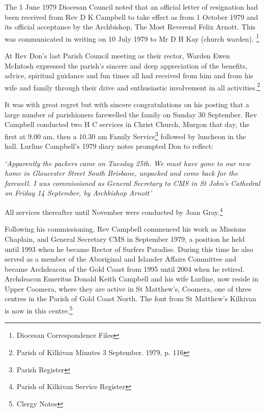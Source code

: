 The 1 June 1979 Diocesan Council noted that an official letter of resignation had been received from Rev D K Campbell to take effect as from 1 October 1979 and its official acceptance by the Archbishop, The Most Reverend Felix Arnott. This was communicated in writing on 10 July 1979 to Mr D H Kay (church warden). \footnote{Diocesan Correspondence Files}


At Rev Don's last Parish Council meeting as their rector, Warden Ewen McIntosh expressed the parish's sincere and deep appreciation of the benefits, advice, spiritual guidance and fun times all had received from him and from his wife and family through their drive and enthusiastic involvement in all activities.\footnote{Parish of Kilkivan Minutes 3 September. 1979, p. 116}


It was with great regret but with sincere congratulations on his posting that a large number of parishioners farewelled the family on Sunday 30 September. Rev Campbell conducted two H C services in Christ Church, Murgon that day, the first at 9.00 am, then a 10.30 am Family Service\footnote{Parish Register} followed by luncheon in the hall. Lurline Campbell's 1979 diary notes prompted Don to reflect:


\emph{`Apparently the packers came on Tuesday 25th. We must have gone to our new home in Gloucester Street South Brisbane, unpacked and come back for the farewell. I was commissioned as General Secretary to CMS in St John's Cathedral on Friday 14 September, by Archbishop Arnott'}



All services thereafter until November were conducted by Joan Gray.\footnote{Parish of Kilkivan Service Register}


Following his commissioning, Rev Campbell commenced his work as Missions Chaplain, and General Secretary CMS in September 1979, a position he held until 1993 when he became Rector of Surfers Paradise. During this time he also served as a member of the Aboriginal and Islander Affairs Committee and became Archdeacon of the Gold Coast from 1995 until 2004 when he retired. Archdeacon Emeritus Donald Keith Campbell and his wife Lurline, now reside in Upper Coomera, where they are active in St Matthew's, Coomera, one of three centres in the Parish of Gold Coast North. The font from St Matthew's Kilkivan is now in this centre.\footnote{Clergy Notes}


